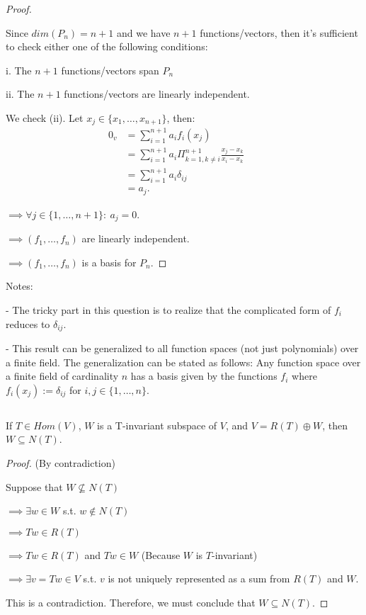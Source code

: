 \documentclass{article}
\newenvironment{customthm}[1]
  {\renewcommand\theinnercustomthm{#1}\innercustomthm}
  {\endinnercustomthm}
\begin{document}
\begin{proof}
  $ $

  Since $dim(P_n) = n+1$ and we have $n+1$ functions/vectors, then it's sufficient to check either one of the following conditions: 
  
  \qquad i. The $n+1$ functions/vectors span $P_n$

  \qquad ii. The $n+1$ functions/vectors are linearly independent.
  \newline

  We check (ii). Let $x_j \in \{x_1,\ldots,x_{n+1}\}$, then:
  \begin{align*}
    0_v &= \sum_{i=1}^{n+1} a_i f_i(x_j) &&\\
    &= \sum_{i=1}^{n+1} a_i \Pi_{k=1, k \neq i}^{n+1}\frac{x_j - x_k}{x_i - x_k} &&\\
    &= \sum_{i=1}^{n+1} a_i \delta_{ij} &&\\
    &= a_j.
  \end{align*}

  \noindent
  $\implies \forall j \in \{1,\ldots,n+1\}: \  a_j = 0$.

  \noindent
  $\implies (f_1,\ldots,f_n)$ are linearly independent.

  \noindent
  $\implies (f_1,\ldots,f_n)$ is a basis for $P_n$.

\end{proof}

\noindent
Notes:

\quad - The tricky part in this question is to realize that the complicated form of $f_i$ reduces to $\delta_{ij}$.

\quad - This result can be generalized to all function spaces (not just polynomials) over a finite field. The generalization can be stated as follows: Any function space over a finite field of cardinality $n$ has a basis given by the functions $f_i$ where $f_i(x_j) := \delta_{ij}$ for $i,j \in \{1,\ldots,n\}$.
\newpage

\begin{customthm}{3}[2023.S(1.A.iii)]
  $ $

  If $T \in Hom(V)$, $W$ is a T-invariant subspace of $V$, and $V = R(T) \oplus W$, then $W \subseteq N(T)$. 

\end{customthm}
\begin{proof}{(By contradiction)}
  $ $

  Suppose that $W \not\subseteq N(T)$
  
  \noindent
  $\implies \exists w \in W$ s.t. $w \notin N(T)$

  \noindent
  $\implies Tw \in R(T)$

  \noindent
  $\implies Tw \in R(T)$ and $Tw \in W$ \quad (Because $W$ is $T$-invariant)

  \noindent
  $\implies \exists v=Tw \in V$ s.t. $v$ is not uniquely represented as a sum from $R(T)$ and $W$.
  \newline

  \noindent
  This is a contradiction. Therefore, we must conclude that $W \subseteq N(T)$.

\end{proof}
\newpage
\end{document}
